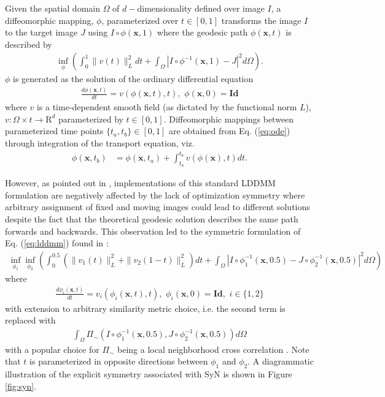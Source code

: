 \documentclass{frontiersSCNS}
\begin{document}
Given the spatial domain $\Omega$ of $d-$dimensionality
defined over image $I$, a diffeomorphic
mapping, $\phi$, parameterized over $t \in [0,1]$ transforms the image
$I$ to the target image $J$ using $I\circ\phi(\mathbf{x},1)$ where the
geodesic path $\phi(\mathbf{x},t)$ is described by \citep{beg2005}
\begin{align}
  \inf_{\phi} \left( \int_0^1 \|v(t)\|_L^2 dt +
                     \int_{\Omega} | I \circ \phi^{-1}(\mathbf{x},1) - J |^2 d\Omega
              \right).
  \label{eq:lddmm}
\end{align}
$\phi$ is generated as the solution of the ordinary differential equation
\begin{align}
  \frac{d \phi(\mathbf{x},t)}{dt} = v( \phi(\mathbf{x},t), t ),\,\, \phi(\mathbf{x},0) = \mathbf{Id}
\label{eq:ode}
\end{align}
where $v$ is a time-dependent smooth field (as dictated by the functional norm $L$), $v : \Omega \times t
\rightarrow \mathrm{R}^d$ parameterized by $t \in [0,1]$.  Diffeomorphic mappings
between parameterized time points $\{t_a,t_b\} \in [0,1]$
are obtained from  Eq. (\ref{eq:ode}) through integration of the transport
equation, viz.
\begin{align}
  \label{eq:integral}
\phi(\mathbf{x},t_b) &= \phi(\mathbf{x},t_a) + \int_{t_a}^{t_b} v(\phi(\mathbf{x}), t) dt.
\end{align}

However,
as pointed out in \cite{avants2008}, implementations of this standard
LDDMM formulation are negatively affected by the lack of optimization
symmetry where arbitrary assignment of fixed and moving images could
lead to different solutions despite the fact that the theoretical
geodesic solution describes the same path forwards and backwards.
This observation led to the symmetric
formulation of Eq. (\ref{eq:lddmm}) found in \cite{avants2008}:
\begin{align}
  \inf_{\phi_1} \inf_{\phi_2} \left(
                     \int_0^{0.5} \left( \|v_1(t)\|_L^2 + \|v_2(1-t)\|_L^2 \right) dt +
                     \int_{\Omega} | I \circ \phi_1^{-1}(\mathbf{x},0.5)
                           - J \circ \phi_2^{-1}(\mathbf{x},0.5) |^2 d\Omega
              \right)
\end{align}
where
\begin{align}
  \frac{d \phi_i(\mathbf{x},t)}{dt} = v_i( \phi_i(\mathbf{x},t), t ),\,\, \phi_i(\mathbf{x},0) = \mathbf{Id}, \,\, i \in \{1,2\}
\end{align}
with extension to arbitrary similarity metric choice, i.e. the second
term is replaced with
\begin{align}
\int_{\Omega} \Pi_{\sim}
                          \left( I \circ \phi_1^{-1}(\mathbf{x},0.5),
                           J \circ \phi_2^{-1}(\mathbf{x},0.5) \right) d\Omega
\end{align}
with a popular choice for $\Pi_{\sim}$ being a local neighborhood cross
correlation \citep{avants2008,avants2011}.
Note that
$t$ is parameterized in opposite directions between $\phi_1$ and $\phi_2$.
A diagrammatic
illustration of the explicit symmetry associated with SyN is shown in
Figure \ref{fig:syn}.
\end{document}
